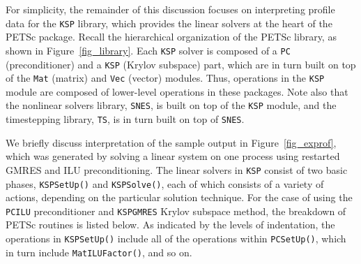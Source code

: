 For simplicity, the remainder of this discussion focuses on
interpreting profile data for the \lstinline{KSP} library,
which provides the linear solvers at the heart of the
PETSc package.  Recall the hierarchical organization of the PETSc
library, as shown in Figure~\ref{fig_library}.  Each \lstinline{KSP} solver
is composed of a \lstinline{PC} (preconditioner) and a \lstinline{KSP} (Krylov
subspace) part, which are in turn built on top of the \lstinline{Mat}
(matrix) and \lstinline{Vec} (vector) modules.  Thus, operations in the
\lstinline{KSP} module are composed of lower-level operations in these
packages.  Note also that the nonlinear solvers library, \lstinline{SNES},
is built on top of the \lstinline{KSP} module, and the timestepping
library, \lstinline{TS}, is in turn built on top of \lstinline{SNES}.

We briefly discuss interpretation of the sample output in
Figure~\ref{fig_exprof}, which was generated by solving a linear
system on one process using restarted GMRES and ILU
preconditioning.  The linear solvers in \lstinline{KSP} consist of two
basic phases, \lstinline{KSPSetUp()} and \lstinline{KSPSolve()}, each of which
consists of a variety of actions, depending on the particular
solution technique.
For the case of using the \lstinline{PCILU} preconditioner and \lstinline{KSPGMRES}
Krylov subspace method, the breakdown of PETSc routines is listed below.
As indicated by the levels of indentation, the
operations in \lstinline{KSPSetUp()} include all of the operations within
\lstinline{PCSetUp()}, which in turn include \lstinline{MatILUFactor()}, and so on.
